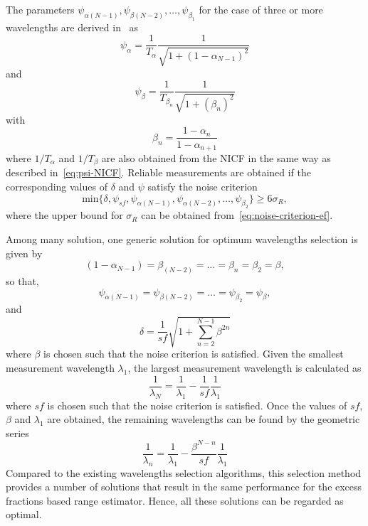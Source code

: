 The parameters $\psi_{\alpha(N-1)}, \psi_{\beta(N-2)}, \ldots, \psi_{\beta_1}$ for the case of three or more wavelengths are derived in~\cite{Falaggis_excess_fractions_2011} as
\[
\psi_{\alpha} = \frac{1}{T_{\alpha}} \frac{1}{\sqrt{1 + (1 - \alpha_{N-1})^2}}
\]
and
\[
\psi_{\beta} = \frac{1}{T_{\beta_n}} \frac{1}{\sqrt{1 + (\beta_n)^2}}
\]
with
\[
\beta_n = \frac{1 - \alpha_n}{1 - \alpha_{n+1}}
\]
where $1/T_{\alpha}$ and $1/T_{\beta}$ are also obtained from the NICF in the same way as described in~\ref{eq:psi-NICF}. Reliable measurements are obtained if the corresponding values of $\delta$ and $\psi$ satisfy the noise criterion
\[
\text{min} \{   \delta, \psi_{sf}, \psi_{\alpha(N-1)}, \psi_{\alpha(N-2)} , \ldots, \psi_{\beta_2}  \} \geq 6\sigma_R,
\]
where the upper bound for $\sigma_R$ can be obtained from~\ref{eq:noise-criterion-ef}.

Among many solution, one generic solution for optimum wavelengths selection is given by~\cite{Falaggis_excess_fractions_2012}
\[
(1 - \alpha_{N-1}) = \beta_{(N-2)} = \ldots = \beta_n = \beta_2 = \beta,
\]
so that,
\[
\psi_{\alpha(N-1)} = \psi_{\beta(N-2)} = \ldots = \psi_{\beta_2} = \psi_{\beta},
\]
and
\[
\delta = \frac{1}{sf} \sqrt{1 + \sum_{n=2}^{N-1} \beta^{2n}}
\]
where $\beta$ is chosen such that the noise criterion is satisfied. Given the smallest measurement wavelength $\lambda_1$, the largest measurement wavelength is calculated as
\[
\frac{1}{\lambda_N} = \frac{1}{\lambda_1} - \frac{1}{sf}\frac{1}{\lambda_1}
\]
where $sf$ is chosen such that the noise criterion is satisfied. Once the values of $sf$, $\beta$ and $\lambda_1$ are obtained, the remaining wavelengths can be found by the geometric series~\cite{Falaggis_excess_fractions_2012}
\[
\frac{1}{\lambda_n} =  \frac{1}{\lambda_1} - \frac{\beta^{N-n}}{sf} \frac{1}{\lambda_1}
\]
Compared to the existing wavelengths selection algorithms, this selection method provides a number of solutions that result in the same performance for the excess fractions based range estimator. Hence, all these solutions can be regarded as optimal.

